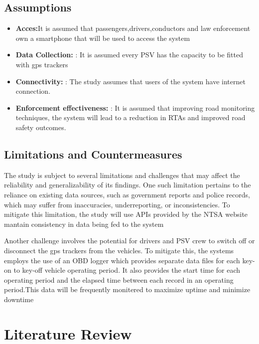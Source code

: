 \documentclass[a4paper, 12pt]{report}
\begin{document}
\section{Assumptions}
\begin{itemize}
\item \textbf{Acces:}It is assumed that passengers,drivers,conductors and law enforcement own a smartphone that will be used to access the system

\item \textbf{Data Collection: }: It is assumed every PSV has the capacity to be fitted
with gps trackers
\item \textbf{Connectivity: }: The study assumes that users of the system have internet
connection.
\item \textbf{Enforcement effectiveness:} : It is assumed that improving road monitoring techniques, the system will lead to a reduction in RTAs and improved
road safety outcomes.
\end{itemize}

\section{Limitations and Countermeasures}
\noindent The study is subject to several limitations and challenges that may affect the reliability and generalizability of its findings. One such limitation pertains to the
reliance on existing data sources, such as government reports and police records,
which may suffer from inaccuracies, underreporting, or inconsistencies. To mitigate this limitation, the study will use APIs provided by the NTSA website mantain consistency in data being fed to the system\par
\noindent Another challenge involves the potential for drivers and PSV crew to switch off
or disconnect the gps trackers from the vehicles. To mitigate this, the systems
employs the use of an OBD logger which provides separate data files for each
key-on to key-off vehicle operating period. It also provides the start time for
each operating period and the elapsed time between each record in an operating
period.This data will be frequently monitered to maximize uptime and minimize downtime

\chapter{Literature Review}
\end{document}
